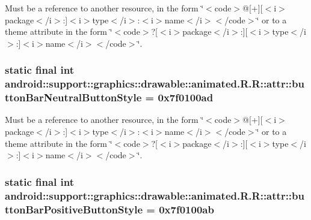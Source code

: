 Must be a reference to another resource, in the form \char`\"{}$<$code$>$@\mbox{[}+\mbox{]}\mbox{[}$<$i$>$package$<$/i$>$:\mbox{]}$<$i$>$type$<$/i$>$:$<$i$>$name$<$/i$>$$<$/code$>$\char`\"{} or to a theme attribute in the form \char`\"{}$<$code$>$?\mbox{[}$<$i$>$package$<$/i$>$:\mbox{]}\mbox{[}$<$i$>$type$<$/i$>$:\mbox{]}$<$i$>$name$<$/i$>$$<$/code$>$\char`\"{}. \hypertarget{classandroid_1_1support_1_1graphics_1_1drawable_1_1animated_1_1_r_1_1attr_e74b77f8402d556c47d9dd4148f293c7}{
\subsubsection[{buttonBarNeutralButtonStyle}]{\setlength{\rightskip}{0pt plus 5cm}static final int android::support::graphics::drawable::animated.R.R::attr::buttonBarNeutralButtonStyle = 0x7f0100ad}}
\label{classandroid_1_1support_1_1graphics_1_1drawable_1_1animated_1_1_r_1_1attr_e74b77f8402d556c47d9dd4148f293c7}


Must be a reference to another resource, in the form \char`\"{}$<$code$>$@\mbox{[}+\mbox{]}\mbox{[}$<$i$>$package$<$/i$>$:\mbox{]}$<$i$>$type$<$/i$>$:$<$i$>$name$<$/i$>$$<$/code$>$\char`\"{} or to a theme attribute in the form \char`\"{}$<$code$>$?\mbox{[}$<$i$>$package$<$/i$>$:\mbox{]}\mbox{[}$<$i$>$type$<$/i$>$:\mbox{]}$<$i$>$name$<$/i$>$$<$/code$>$\char`\"{}. \hypertarget{classandroid_1_1support_1_1graphics_1_1drawable_1_1animated_1_1_r_1_1attr_7f733c89dcc923bb997fe8096a628e47}{
\subsubsection[{buttonBarPositiveButtonStyle}]{\setlength{\rightskip}{0pt plus 5cm}static final int android::support::graphics::drawable::animated.R.R::attr::buttonBarPositiveButtonStyle = 0x7f0100ab}}
\label{classandroid_1_1support_1_1graphics_1_1drawable_1_1animated_1_1_r_1_1attr_7f733c89dcc923bb997fe8096a628e47}


